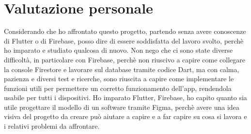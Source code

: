 \section{Valutazione personale}
Considerando che ho affrontato questo progetto, partendo senza avere conoscenze di Flutter o di Firebase, posso dire di essere soddisfatta del lavoro svolto, perchè ho imparato e studiato qualcosa di nuovo.\newline
Non nego che ci sono state diverse difficoltà, in particolare con Firebase, perchè non riuscivo a capire come collegare la console Firestore e lavorare sul database tramite codice Dart, ma con calma, pazienza e diversi test e ricerche, sono riuscita a capire come implementare le funzioni utili per permettere un corretto funzionamento dell'app, rendendola usabile per tutti i dispositivi.\newline
Ho imparato Flutter, Firebase, ho capito quanto sia utile progettare il modello di un software tramite Figma, perchè avere una idea visiva del progetto da creare può aiutare a capire e a far capire su cosa si lavora e i relativi problemi da affrontare.\newline

